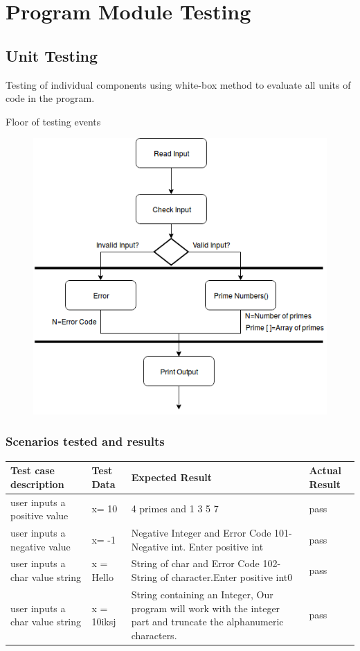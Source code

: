 \documentclass[11 pt]{article}
\begin{document}
\section{Program Module Testing}
\subsection{Unit Testing}
Testing of individual components using white-box method to evaluate all units of code in the program.\\
\newpage

Floor of testing events
\begin{figure}[h]
    \centering
    
    \includegraphics[width=\linewidth]{Integration Testing.png}
    \end{figure}


\subsubsection{Scenarios tested and results}

\begin{tabular}{|p{4cm}|p{3cm}|p{4cm}|p{3cm}|}
\hline
\textbf{Test case description} &\textbf{Test Data} & \textbf{Expected Result} & \textbf{Actual Result}\\
\hline
 user inputs a positive value & x= 10 & 4 primes and 1 3 5 7 & pass\\
 \hline
user inputs a negative value  & x= -1 &  Negative Integer and  Error Code 101-Negative     int. Enter positive int & pass \\
 \hline
user inputs a char value string & x = Hello &String of char and Error Code 102-String of     character.Enter positive int0
 & pass \\
 \hline
 user inputs a char value string & x = 10iksj & String containing an Integer,    Our program will work with the integer part and truncate the alphanumeric characters.
 & pass \\
 \hline
 \end{tabular}
\end{document}
